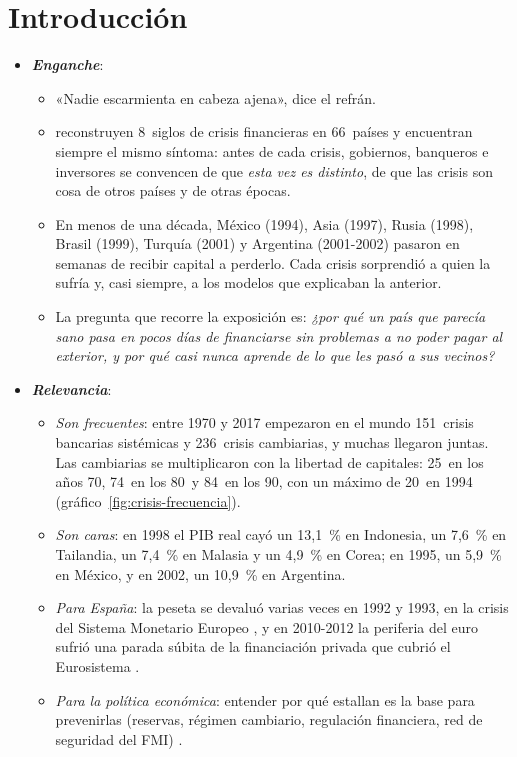 \documentclass[11pt]{article}
\begin{document}
\tceetitulo

\section*{Introducción}

\begin{itemize}
\item \textbf{\emph{Enganche}}:
  \begin{itemize}
  \item «Nadie escarmienta en cabeza ajena», dice el refrán.
  \item \textcite{ReinhartRogoff2009This} reconstruyen 8~siglos de crisis financieras en 66~países y encuentran siempre el mismo síntoma: antes de cada crisis, gobiernos, banqueros e inversores se convencen de que \emph{esta vez es distinto}, de que las crisis son cosa de otros países y de otras épocas.
  \item En menos de una década, México (1994), Asia (1997), Rusia (1998), Brasil (1999), Turquía (2001) y Argentina (2001-2002) pasaron en semanas de recibir capital a perderlo\nocite{LaevenValencia2020}. Cada crisis sorprendió a quien la sufría y, casi siempre, a los modelos que explicaban la anterior.
  \item La pregunta que recorre la exposición es: \emph{¿por qué un país que parecía sano pasa en pocos días de financiarse sin problemas a no poder pagar al exterior, y por qué casi nunca aprende de lo que les pasó a sus vecinos?}
  \end{itemize}

\item \textbf{\emph{Relevancia}}:
  \begin{itemize}
  \item \emph{Son frecuentes}: entre 1970 y 2017 empezaron en el mundo 151~crisis bancarias sistémicas y 236~crisis cambiarias, y muchas llegaron juntas\nocite{LaevenValencia2020}. Las cambiarias se multiplicaron con la libertad de capitales: 25~en los años 70, 74~en los 80~y 84~en los 90, con un máximo de 20~en 1994 (gráfico~\ref{fig:crisis-frecuencia}).
  \item \emph{Son caras}: en 1998 el PIB real cayó un 13,1~\% en Indonesia, un 7,6~\% en Tailandia, un 7,4~\% en Malasia y un 4,9~\% en Corea; en 1995, un 5,9~\% en México, y en 2002, un 10,9~\% en Argentina\nocite{FMI2026WEOdatos,BM2026WDIcrecimiento}.
  \item \emph{Para España}: la peseta se devaluó varias veces en 1992 y 1993, en la crisis del Sistema Monetario Europeo\nocite{EichengreenWyplosz1993Unstable}  , y en 2010-2012 la periferia del euro sufrió una parada súbita de la financiación privada que cubrió el Eurosistema   .
  \item \emph{Para la política económica}: entender por qué estallan es la base para prevenirlas (reservas, régimen cambiario, regulación financiera, red de seguridad del FMI)   .
  \end{itemize}
\end{itemize}
\end{document}
